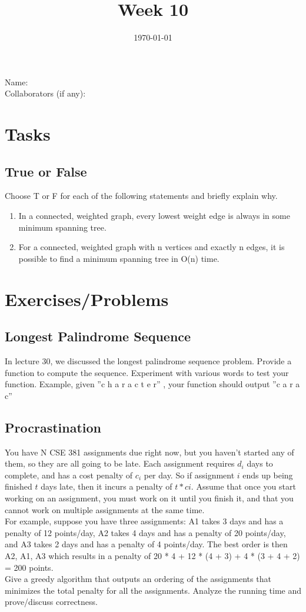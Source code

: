 \documentclass[12pt]{amsart}
\title{Week 10}
\date{\today}
\begin{document}
\maketitle


Name: 
\\

Collaborators (if any): 

\section{Tasks}

\subsection{True or False}
Choose T or F for each of the following statements and briefly explain why.  
\begin{enumerate}
\item In a connected, weighted graph, every lowest weight edge is always in some minimum spanning tree. 
\item For a connected, weighted graph with n vertices and exactly n edges, it is possible to find a minimum spanning tree in O(n) time. 
\end{enumerate}

\section{Exercises/Problems}

\subsection{Longest Palindrome Sequence} 
In lecture 30, we discussed the longest palindrome sequence problem. Provide a function to compute the sequence. Experiment with various words to test your function. Example, given ''c h a r a c t e r'' , your function should output ''c a r a c''

\subsection{Procrastination}
You have N CSE 381 assignments due right now, but you haven't started any of them, so they are all going to be late. Each assignment requires $d_i$ days to complete, and has a cost penalty of $c_i$ per day. So if assignment $i$ ends up being finished $t$ days late, then it incurs a penalty of $t * ci$. Assume that once you start working on an assignment, you must work on it until you finish it, and that you cannot work on multiple assignments at the same time. 
\\

For example, suppose you have three assignments: A1 takes 3 days and has a penalty of 12 points/day, A2 takes 4 days and has a penalty of 20 points/day, and A3 takes 2 days and has
a penalty of 4 points/day. The best order is then A2, A1, A3 which results in a penalty of 20 * 4 + 12 * (4 + 3) + 4 * (3 + 4 + 2) = 200 points. 
\\

Give a greedy algorithm that outputs an ordering of the assignments that minimizes the total penalty for all the assignments. Analyze the running time and prove/discuss correctness. 
\end{document}
